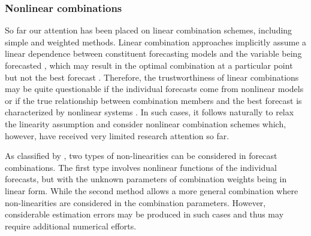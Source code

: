 \documentclass[11pt]{article}
\begin{document}
\subsubsection{Nonlinear combinations}
\label{sec:nonlinear_combinations}

So far our attention has been placed on linear combination schemes, including simple and weighted methods. Linear combination approaches implicitly assume a linear dependence between constituent forecasting models and the variable being forecasted \citep{Donaldson1996-um,Freitas2006-fn}, which may result in the optimal combination at a particular point but not the best forecast \citep{Ming_Shi1999-vs}. Therefore, the trustworthiness of linear combinations may be quite questionable if the individual forecasts come from nonlinear models or if the true relationship between combination members and the best forecast is characterized by nonlinear systems \citep{Babikir2016-xz}. In such cases, it follows naturally to relax the linearity assumption and consider nonlinear combination schemes which, however, have received very limited research attention so far.

As classified by \cite{Timmermann2006-en}, two types of non-linearities can be considered in forecast combinations. The first type involves nonlinear functions of the individual forecasts, but with the unknown parameters of combination weights being in linear form. While the second method allows a more general combination where non-linearities are considered in the combination parameters. However, considerable estimation errors may be produced in such cases and thus may require additional numerical efforts.
\end{document}
